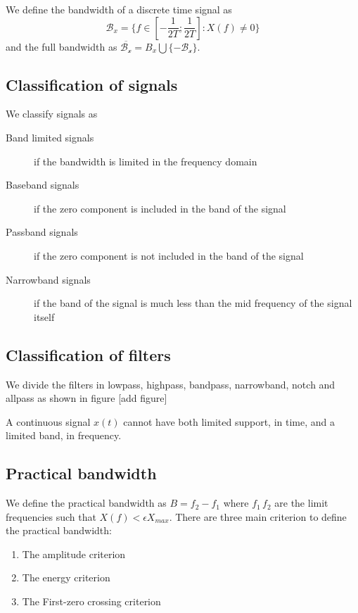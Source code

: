 We define the bandwidth of a discrete time signal as
\begin{equation}
  \mathcal{B}_x = \lbrace f \in \left[-\frac{1}{2T};\frac{1}{2T}\right] : X(f) \neq 0 \rbrace
\end{equation}
and the full bandwidth as $\overline{\mathcal{B_x}} = B_x \bigcup \lbrace -\mathcal{B_x}\rbrace$.

\subsection{Classification of signals}
We classify signals as
\begin{description}
  \item[Band limited signals] if the bandwidth is limited in the frequency domain
  \item[Baseband signals] if the zero component is included in the band of the signal
  \item[Passband signals] if the zero component is not included in the band of the signal
  \item[Narrowband signals] if the band of the signal is much less than the mid frequency of the signal itself
\end{description}

\subsection{Classification of filters}
We divide the filters in lowpass, highpass, bandpass, narrowband, notch and allpass as shown in figure [add figure]

\begin{definition}
  A continuous signal $x(t)$ cannot have both limited support, in time, and a limited band, in frequency.
\end{definition}
\subsection{Practical bandwidth}
We define the practical bandwidth as $B=f_2 - f_1$ where $f_1 \, f_2$ are the limit frequencies such that $X(f)< \epsilon X_{max}$.
There are three main criterion to define the practical bandwidth:
\begin{enumerate}
  \item The amplitude criterion
  \item The energy criterion
  \item The First-zero crossing criterion
\end{enumerate}
